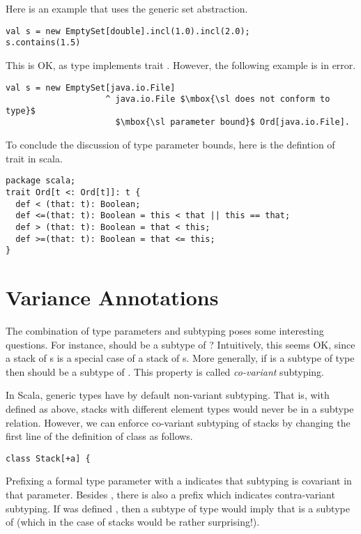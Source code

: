 Here is an example that uses the generic set abstraction.
\begin{lstlisting}
val s = new EmptySet[double].incl(1.0).incl(2.0);
s.contains(1.5)
\end{lstlisting}
This is OK, as type  implements trait .
However, the following example is in error.
\begin{lstlisting}
val s = new EmptySet[java.io.File]
                    ^ java.io.File $\mbox{\sl does not conform to type}$
                      $\mbox{\sl parameter bound}$ Ord[java.io.File].
\end{lstlisting}
To conclude the discussion of type parameter
bounds, here is the defintion of trait  in scala.
\begin{lstlisting}
package scala;
trait Ord[t <: Ord[t]]: t {
  def < (that: t): Boolean;
  def <=(that: t): Boolean = this < that || this == that;
  def > (that: t): Boolean = that < this;
  def >=(that: t): Boolean = that <= this;
}
\end{lstlisting}

\section{Variance Annotations}\label{sec:first-arrays}

The combination of type parameters and subtyping poses some
interesting questions. For instance, should  be a
subtype of ? Intuitively, this seems OK, since a
stack of s is a special case of a stack of
s.  More generally, if  is a subtype of type 
then  should be a subtype of . 
This property is called {\em co-variant} subtyping.

In Scala, generic types have by default non-variant subtyping. That
is, with  defined as above, stacks with different element
types would never be in a subtype relation. However, we can enforce
co-variant subtyping of stacks by changing the first line of the
definition of class  as follows.
\begin{lstlisting}
class Stack[+a] {
\end{lstlisting}
Prefixing a formal type parameter with a \code{+} indicates that
subtyping is covariant in that parameter. 
Besides \code{+}, there is also a prefix \code{-} which indicates
contra-variant subtyping. If  was defined , then  a subtype of type  would imply
that  is a subtype of  (which in the
case of stacks would be rather surprising!).

